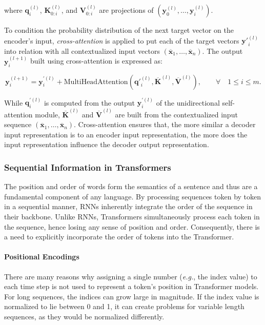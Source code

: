 \noindent where $\bm{q}^{(l)}_i$, $\bm{K}^{(l)}_{0:i}$, and $\bm{V}^{(l)}_{0:i}$ are projections of $(\bm{y}^{(l)}_0, \ldots, \bm{y}^{(l)}_i)$.

To condition the probability distribution of the next target vector on the encoder's input, \textit{cross-attention} is applied to put each of the target vectors $\bm{y}'^{(l)}_i$ into relation with all contextualized input vectors $(\overline{\bm{x}}_1, \ldots, \overline{\bm{x}}_n)$. The output $\bm{y}^{(l+1)}_i$ built using cross-attention is expressed as:

\begin{equation}
    \bm{y}^{(l+1)}_i = \bm{y}^{\prime(l)}_i + \textrm{MultiHeadAttention}\left(\bm{q}'^{(l)}_i, \overline{\bm{K}}^{(l)}, \overline{\bm{V}}^{(l)}\right), \qquad \forall \quad 1 \leq i \leq m.
\end{equation}

\noindent While $\bm{q}^{\prime(l)}_i$ is computed from the output $\bm{y}^{\prime(l)}_i$ of the unidirectional self-attention module, $\overline{\bm{K}}^{(l)}$ and $\overline{\bm{V}}^{(l)}$ are built from the contextualized input sequence $(\overline{\bm{x}}_1, \ldots, \overline{\bm{x}}_n)$. Cross-attention ensures that, the more similar a decoder input representation is to an encoder input representation, the more does the input representation influence the decoder output representation.



\subsubsection{Sequential Information in Transformers}

The position and order of words form the semantics of a sentence and thus are a fundamental component of any language. By processing sequences token by token in a sequential manner, \acp{RNN} inherently integrate the order of the sequence in their backbone. Unlike \acp{RNN}, Transformers simultaneously process each token in the sequence, hence losing any sense of position and order. Consequently, there is a need to explicitly incorporate the order of tokens into the Transformer.

\paragraph{Positional Encodings} There are many reasons why assigning a single number (\textit{e.g.}, the index value) to each time step is not used to represent a token's position in Transformer models. For long sequences, the indices can grow large in magnitude. If the index value is normalized to lie between 0 and 1, it can create problems for variable length sequences, as they would be normalized differently. 

